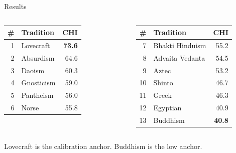 \documentclass[10pt, aspectratio=169]{beamer}
\begin{document}
\begin{frame}{Results}
  \small
  \begin{columns}[T]
    \begin{tabular}{rlr}
      \toprule
      \# & Tradition & CHI \\
      \midrule
      \rowcolor{lovecraftred!20}
      1 & Lovecraft          & \textbf{73.6} \\
      \rowcolor{highchi!15}
      2 & Absurdism          & 64.6 \\
      \rowcolor{highchi!10}
      3 & Daoism             & 60.3 \\
      4 & Gnosticism         & 59.0 \\
      5 & Pantheism          & 56.0 \\
      6 & Norse              & 55.8 \\
      \bottomrule
    \end{tabular}
    \begin{tabular}{rlr}
      \toprule
      \# & Tradition & CHI \\
      \midrule
      7  & Bhakti Hinduism    & 55.2 \\
      8  & Advaita Vedanta    & 54.5 \\
      9  & Aztec              & 53.2 \\
      \rowcolor{lowchi!15}
      10 & Shinto             & 46.7 \\
      \rowcolor{lowchi!15}
      11 & Greek              & 46.3 \\
      \rowcolor{lowchi!20}
      12 & Egyptian           & 40.9 \\
      \rowcolor{lowchi!20}
      13 & Buddhism           & \textbf{40.8} \\
      \bottomrule
    \end{tabular}
  \end{columns}
  \vspace{0.4em}
  \small\textcolor{accent}{Lovecraft is the calibration anchor. Buddhism is the low anchor.}
\end{frame}
\end{document}
